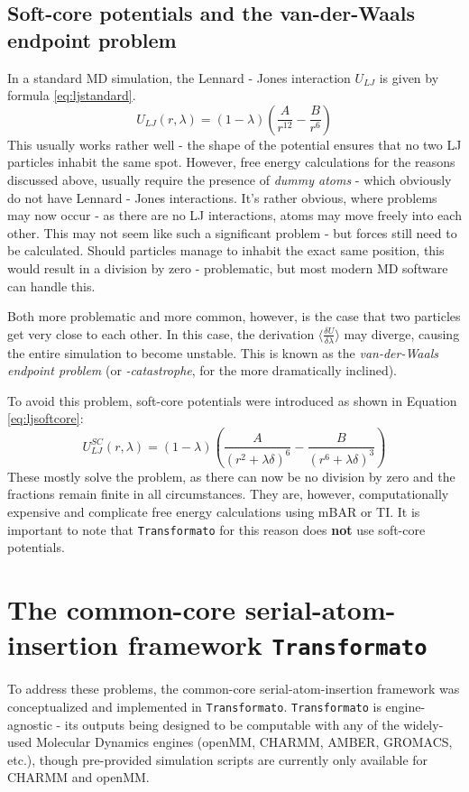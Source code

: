 \documentclass[oneside]{scrreprt}
\begin{document}
\subsection{Soft-core potentials and the van-der-Waals endpoint problem}
In a standard MD simulation, the Lennard - Jones interaction $U_{LJ}$ is given by formula \ref{eq:ljstandard}.
\begin{equation}
U_{LJ}(r,\lambda)=(1-\lambda)(\frac{A}{r^{12}} - \frac{B}{r^6})
\label{eq:ljstandard}
\end{equation}
This usually works rather well -  the shape of the potential ensures that no two LJ particles inhabit the same spot. However, free energy calculations for the reasons discussed above, usually require the presence of \textit{dummy atoms} - which obviously do not have Lennard - Jones interactions. It's rather obvious, where problems may now occur -  as there are no LJ interactions, atoms may move freely into each other. This may not seem like such a significant problem - but forces still need to be calculated. Should particles manage to inhabit the exact same position, this would result in a division by zero - problematic, but most modern MD software can handle this. 

Both more problematic and more common, however, is the case that two particles get very close to each other. In this case, the derivation $\langle \frac{\delta U}{\delta\lambda} \rangle$ may diverge, causing the entire simulation to become unstable. This is known as the \textit{van-der-Waals endpoint problem} (or \textit{-catastrophe}, for the more dramatically inclined).

To avoid this problem, soft-core potentials were introduced as shown in Equation \ref{eq:ljsoftcore}\supercite{Beutler1994Jun}:
\begin{equation}
U_{LJ}^{SC}(r,\lambda)=(1-\lambda)(\frac{A}{(r^2 +\lambda \delta)^6 }-\frac{B}{(r^6 +\lambda \delta)^3})
\label{eq:ljsoftcore}
\end{equation}
These mostly solve the problem, as there can now be no division by zero and the fractions remain finite in all circumstances. They are, however, computationally expensive and complicate free energy calculations using mBAR or TI\supercite{Li2020Aug}. It is important to note that \texttt{Transformato} for this reason does \textbf{not} use soft-core potentials.


\section{The common-core serial-atom-insertion framework {\texttt{Transformato}}}
To address these problems, the common-core serial-atom-insertion framework was conceptualized and implemented in \texttt{Transformato}. \texttt{Transformato} is engine-agnostic - its outputs being designed to be computable with any of the widely-used Molecular Dynamics engines (openMM, CHARMM, AMBER, GROMACS, etc.), though pre-provided simulation scripts are currently only available for CHARMM and openMM.
\end{document}
